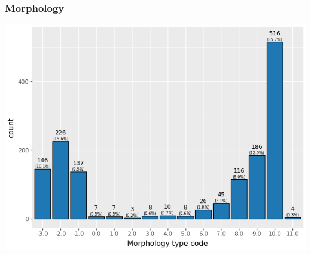 \documentclass[a4paper]{article}
\begin{document}
\subsubsection{Morphology}
\label{sec:org66e126b}
\begin{center}
\includegraphics[width=.9\linewidth]{./figure/Types.png}
\end{center}
\end{document}
